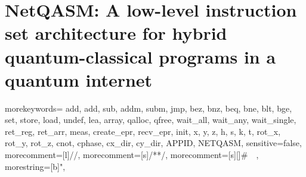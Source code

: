 \chapter
 [NetQASM: A low-level instruction set architecture for hybrid quantum-classical programs in a quantum internet]
 {NetQASM: A low-level instruction set architecture for hybrid quantum-classical programs in a quantum internet}
\label{chp:netqasm}

\newcommand{\netqasm}{\texttt{NetQASM}}
\newcommand{\qasm}{\texttt{QASM}}
\newcommand{\openqasm}{\texttt{OpenQASM}}
\newcommand{\cqc}{\texttt{CQC}}
\newcommand{\qnodeos}{\texttt{QNodeOS}}
\newcommand{\qdevice}{\texttt{QDevice}}
\newcommand{\host}{application layer}
\newcommand{\QNPU}{\texttt{QNPU}}
\newcommand{\netsquid}{\texttt{NetSquid}}
\newcommand{\squidasm}{\texttt{SquidASM}}
\newcommand{\simulaqron}{\texttt{SimulaQron}}
\newcommand{\IMMEDIATE}{\textbf{IMMEDIATE}}
\newcommand{\REGISTER}{\textbf{REGISTER}}
\newcommand{\ADDRESS}{\textbf{ADDRESS}}
\newcommand{\ARRAYENTRY}{\textbf{ARRAY\_ENTRY}}
\newcommand{\ARRAYSLICE}{\textbf{ARRAY\_SLICE}}


{
    morekeywords={
        add, add, sub, addm, subm,
        jmp, bez, bnz, beq, bne, blt, bge,
        set, store, load, undef, lea,
        array, qalloc, qfree,
        wait_all, wait_any, wait_single,
        ret_reg, ret_arr,
        meas,
        create_epr, recv_epr,
        init, x, y, z, h, s, k, t, rot_x, rot_y, rot_z, cnot, cphase, cx_dir, cy_dir,
        APPID, NETQASM,
    }
    sensitive=false,
    morecomment=[l]{//},
    morecomment=[s]{/*}{*/},
    morecomment=[s][\color{blue}]{\#\ }{\ },
    morestring=[b]",
}

